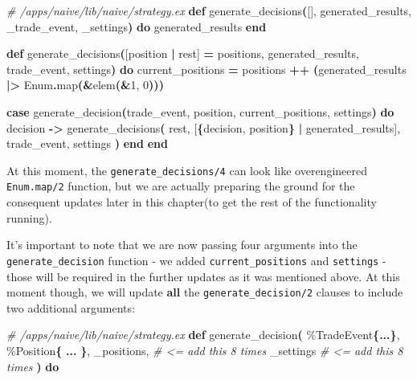 \documentclass[
  oneside]{book}
\newenvironment{Shaded}{\begin{snugshade}}{\end{snugshade}}
\newcommand{\CommentTok}[1]{\textcolor[rgb]{0.56,0.35,0.01}{\textit{#1}}}
\newcommand{\ConstantTok}[1]{\textcolor[rgb]{0.56,0.35,0.01}{#1}}
\newcommand{\DecValTok}[1]{\textcolor[rgb]{0.00,0.00,0.81}{#1}}
\newcommand{\FunctionTok}[1]{\textcolor[rgb]{0.13,0.29,0.53}{\textbf{#1}}}
\newcommand{\KeywordTok}[1]{\textcolor[rgb]{0.13,0.29,0.53}{\textbf{#1}}}
\newcommand{\NormalTok}[1]{#1}
\newcommand{\OperatorTok}[1]{\textcolor[rgb]{0.81,0.36,0.00}{\textbf{#1}}}
\newcommand{\OtherTok}[1]{\textcolor[rgb]{0.56,0.35,0.01}{#1}}
\begin{document}
\begin{Shaded}
\begin{Highlighting}[]
  \CommentTok{\# /apps/naive/lib/naive/strategy.ex}
  \KeywordTok{def}\NormalTok{ generate\_decisions}\FunctionTok{(}\OtherTok{[]}\NormalTok{, generated\_results, \_trade\_event, \_settings}\FunctionTok{)} \KeywordTok{do}
\NormalTok{    generated\_results}
  \KeywordTok{end}

  \KeywordTok{def}\NormalTok{ generate\_decisions}\FunctionTok{(}\OtherTok{[}\NormalTok{position }\OperatorTok{|}\NormalTok{ rest}\OtherTok{]} \OperatorTok{=}\NormalTok{ positions, generated\_results, trade\_event, settings}\FunctionTok{)} \KeywordTok{do}
\NormalTok{    current\_positions }\OperatorTok{=}\NormalTok{ positions }\OperatorTok{++} \FunctionTok{(}\NormalTok{generated\_results }\OperatorTok{|\textgreater{}} \ConstantTok{Enum}\OperatorTok{.}\NormalTok{map}\FunctionTok{(}\OperatorTok{\&}\NormalTok{elem}\FunctionTok{(}\OperatorTok{\&}\DecValTok{1}\NormalTok{, }\DecValTok{0}\FunctionTok{)))}

    \KeywordTok{case}\NormalTok{ generate\_decision}\FunctionTok{(}\NormalTok{trade\_event, position, current\_positions, settings}\FunctionTok{)} \KeywordTok{do}
\NormalTok{      decision }\OperatorTok{{-}\textgreater{}}
\NormalTok{        generate\_decisions}\FunctionTok{(}
\NormalTok{          rest,}
          \OtherTok{[}\FunctionTok{\{}\NormalTok{decision, position}\FunctionTok{\}} \OperatorTok{|}\NormalTok{ generated\_results}\OtherTok{]}\NormalTok{,}
\NormalTok{          trade\_event,}
\NormalTok{          settings}
        \FunctionTok{)}
    \KeywordTok{end}
  \KeywordTok{end}
\end{Highlighting}
\end{Shaded}

At this moment, the \texttt{generate\_decisions/4} can look like overengineered \texttt{Enum.map/2} function, but we are actually preparing the ground for the consequent updates later in this chapter(to get the rest of the functionality running).

It's important to note that we are now passing four arguments into the \texttt{generate\_decision} function - we added \texttt{current\_positions} and \texttt{settings} - those will be required in the further updates as it was mentioned above. At this moment though, we will update \textbf{all} the \texttt{generate\_decision/2} clauses to include two additional arguments:

\begin{Shaded}
\begin{Highlighting}[]
  \CommentTok{\# /apps/naive/lib/naive/strategy.ex}
  \KeywordTok{def}\NormalTok{ generate\_decision}\FunctionTok{(}
\NormalTok{        \%}\ConstantTok{TradeEvent}\FunctionTok{\{}\OperatorTok{...}\FunctionTok{\}}\NormalTok{,}
\NormalTok{        \%}\ConstantTok{Position}\FunctionTok{\{}
          \OperatorTok{...}
        \FunctionTok{\}}\NormalTok{,}
\NormalTok{        \_positions, }\CommentTok{\# \textless{}= add this 8 times}
\NormalTok{       \_settings    }\CommentTok{\# \textless{}= add this 8 times}
      \FunctionTok{)} \KeywordTok{do}
\end{Highlighting}
\end{Shaded}
\end{document}
